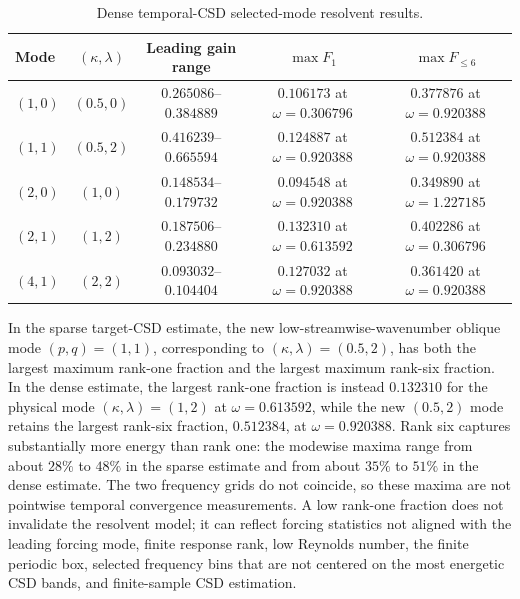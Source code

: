 \documentclass[11pt]{article}
\begin{document}
\begin{table}[H]
  \centering
  \caption{Dense temporal-CSD selected-mode resolvent results.}
  \label{tab:resolvent_dense_results}
  \small
  \begin{tabular}{lcccc}
    \toprule
    Mode & \((\kappa,\lambda)\) & Leading gain range
      & \(\max F_1\) & \(\max F_{\le6}\) \\
    \midrule
    \((1,0)\) & \((0.5,0)\) & \(0.265086\)--\(0.384889\)
      & \(0.106173\) at \(\omega=0.306796\)
      & \(0.377876\) at \(\omega=0.920388\) \\
    \((1,1)\) & \((0.5,2)\) & \(0.416239\)--\(0.665594\)
      & \(0.124887\) at \(\omega=0.920388\)
      & \(0.512384\) at \(\omega=0.920388\) \\
    \((2,0)\) & \((1,0)\) & \(0.148534\)--\(0.179732\)
      & \(0.094548\) at \(\omega=0.920388\)
      & \(0.349890\) at \(\omega=1.227185\) \\
    \((2,1)\) & \((1,2)\) & \(0.187506\)--\(0.234880\)
      & \(0.132310\) at \(\omega=0.613592\)
      & \(0.402286\) at \(\omega=0.306796\) \\
    \((4,1)\) & \((2,2)\) & \(0.093032\)--\(0.104404\)
      & \(0.127032\) at \(\omega=0.920388\)
      & \(0.361420\) at \(\omega=0.920388\) \\
    \bottomrule
  \end{tabular}
\end{table}

In the sparse target-CSD estimate, the new low-streamwise-wavenumber oblique
mode \((p,q)=(1,1)\), corresponding to
\((\kappa,\lambda)=(0.5,2)\), has both the largest maximum rank-one fraction
and the largest maximum rank-six fraction. In the dense estimate, the largest
rank-one fraction is instead \(0.132310\) for the physical mode
\((\kappa,\lambda)=(1,2)\) at \(\omega=0.613592\), while the new
\((0.5,2)\) mode retains the largest rank-six fraction, \(0.512384\), at
\(\omega=0.920388\). Rank six captures substantially more energy than rank
one: the modewise maxima range from about \(28\%\) to \(48\%\) in the sparse
estimate and from about \(35\%\) to \(51\%\) in the dense estimate. The two
frequency grids do not coincide, so these maxima are not pointwise temporal
convergence measurements. A low rank-one fraction does not invalidate the
resolvent model; it can reflect forcing statistics not aligned with the
leading forcing mode, finite response rank, low Reynolds number, the finite
periodic box, selected frequency bins that are not centered on the most
energetic CSD bands, and finite-sample CSD estimation.
\end{document}
